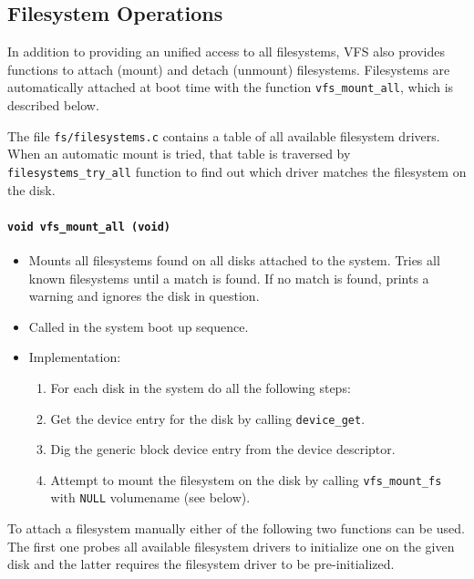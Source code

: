 \documentclass[twoside,a4paper]{report}
\makeatletter
\newenvironment{function}[3]{%
\paragraph{\texttt{#1 {\textbf{#2}} (#3)}}%
\index{#2@\texttt{#2}}%
\begin{itemize}%
}{%
\end{itemize}%
}
\makeatother
\begin{document}
\subsection{Filesystem Operations}
\label{sec:filesysops}

In addition to providing an unified access to all filesystems, VFS
also provides functions to attach (mount) and detach (unmount)
filesystems. Filesystems are automatically attached at boot time
with the function \texttt{vfs\_mount\_all}, which is described below.

The file \texttt{fs/filesystems.c} contains a table of all available
filesystem drivers. When an automatic mount is tried, that table is
traversed by \texttt{filesystems\_try\_all} function to find out which
driver matches the filesystem on the disk.

\begin{function}{void}{vfs\_mount\_all}{void}

\item Mounts all filesystems found on all disks attached to the
system. Tries all known filesystems until a match is found. If no match
is found, prints a warning and ignores the disk in question.

\item Called in the system boot up sequence.

\item Implementation:
\begin{enumerate}

\item For each disk in the system do all the following steps:

\item Get the device entry for the disk by calling \texttt{device\_get}.

\item Dig the generic block device entry from the device descriptor.

\item Attempt to mount the filesystem on the disk by calling
\texttt{vfs\_mount\_fs} with \texttt{NULL} volumename (see below).

\end{enumerate}
\end{function}

To attach a filesystem manually either of the following two functions
can be used. The first one probes all available filesystem drivers to
initialize one on the given disk and the latter requires the
filesystem driver to be pre-initialized.
\end{document}
